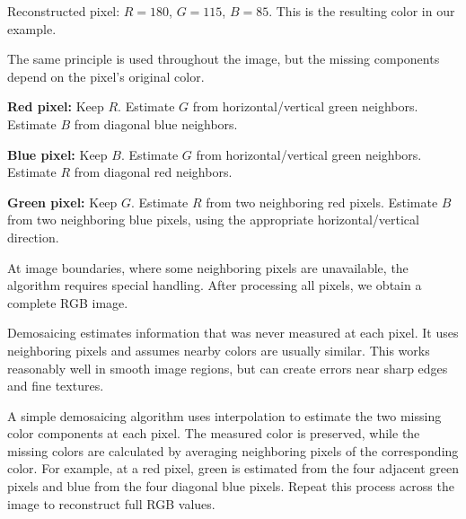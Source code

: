{\begin{center}
\colorbox{reconstructed}{\rule{0pt}{20pt}\hspace{24pt}}
\end{center}
Reconstructed pixel: $R=180$, $G=115$, $B=85$.
This is the resulting color in our example.

The same principle is used throughout the image, but the missing components
depend on the pixel's original color.

\textbf{Red pixel:} Keep $R$.
Estimate $G$ from horizontal/vertical green neighbors.
Estimate $B$ from diagonal blue neighbors.

\textbf{Blue pixel:} Keep $B$.
Estimate $G$ from horizontal/vertical green neighbors.
Estimate $R$ from diagonal red neighbors.

\textbf{Green pixel:} Keep $G$.
Estimate $R$ from two neighboring red pixels.
Estimate $B$ from two neighboring blue pixels, using the appropriate
horizontal/vertical direction.

At image boundaries, where some neighboring pixels are unavailable, the
algorithm requires special handling.
After processing all pixels, we obtain a complete RGB image.

Demosaicing estimates information that was never measured at each pixel.
It uses neighboring pixels and assumes nearby colors are usually similar.
This works reasonably well in smooth image regions, but can create errors
near sharp edges and fine textures.

A simple demosaicing algorithm uses interpolation to estimate the two missing
color components at each pixel.
The measured color is preserved, while the missing colors are calculated by
averaging neighboring pixels of the corresponding color.
For example, at a red pixel, green is estimated from the four adjacent green
pixels and blue from the four diagonal blue pixels.
Repeat this process across the image to reconstruct full RGB values.
}


